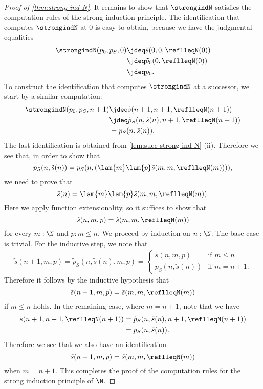 \begin{proof}[Proof of \cref{thm:strong-ind-N}]
  It remains to show that $\strongindN$ satisfies the computation rules of the strong induction principle. The identification that computes $\strongindN$ at $0$ is easy to obtain, because we have the judgmental equalities
  \begin{align*}
    \strongindN(p_0,p_S,0) & \jdeq \tilde{s}(0,0,\reflleqN(0)) \\
                                & \jdeq \tilde{p}_{0}(0,\reflleqN(0)) \\
                                & \jdeq p_0.
  \end{align*}
  To construct the identification that computes $\strongindN$ at a successor, we start by a similar computation:
  \begin{align*}
    \strongindN(p_0,p_S,n+1) & \jdeq \tilde{s}(n+1,n+1,\reflleqN(n+1)) \\
                                   & \jdeq \tilde{p}_S(n,\tilde{s}(n),n+1,\reflleqN(n+1)) \\
    & = p_S(n,\tilde{s}(n)).
  \end{align*}
  The last identification is obtained from \cref{lem:succ-strong-ind-N} (ii).
  Therefore we see that, in order to show that
  \begin{equation*}
    p_S(n,\tilde{s}(n))=p_S(n,(\lam{m}\lam{p}\tilde{s}(m,m,\reflleqN(m)))),
  \end{equation*}
  we need to prove that
  \begin{equation*}
    \tilde{s}(n)=\lam{m}\lam{p}\tilde{s}(m,m,\reflleqN(m)).
  \end{equation*}
  Here we apply function extensionality, so it suffices to show that
  \begin{equation*}
    \tilde{s}(n,m,p)=\tilde{s}(m,m,\reflleqN(m))
  \end{equation*}
  for every $m:\N$ and $p:m\leq n$. We proceed by induction on $n:\N$. The base case is trivial. For the inductive step, we note that
  \begin{align*}
    \tilde{s}(n+1,m,p)=\tilde{p}_S(n,\tilde{s}(n),m,p)=\begin{cases}\tilde{s}(n,m,p) & \text{if }m\leq n \\
    p_S(n,\tilde{s}(n)) & \text{if }m=n+1.\end{cases}
  \end{align*}
  Therefore it follows by the inductive hypothesis that
  \begin{equation*}
    \tilde{s}(n+1,m,p)=\tilde{s}(m,m,\reflleqN(m))
  \end{equation*}
  if $m\leq n$ holds. In the remaining case, where $m=n+1$, note that we have
  \begin{align*}
    \tilde{s}(n+1,n+1,\reflleqN(n+1)) & = \tilde{p}_S(n,\tilde{s}(n),n+1,\reflleqN(n+1)) \\
    & = p_S(n,\tilde{s}(n)).
  \end{align*}
  Therefore we see that we also have an identification
  \begin{equation*}
    \tilde{s}(n+1,m,p)=\tilde{s}(m,m,\reflleqN(m))
  \end{equation*}
  when $m=n+1$. This completes the proof of the computation rules for the strong induction principle of $\N$.
\end{proof}
